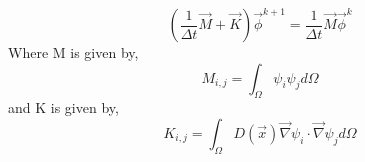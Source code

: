 \documentclass{article}
\begin{document}
\begin{equation}
\left(\frac{1}{\Delta t}\vec{M}+\vec{K}\right)\vec{\phi}^{k+1}=\frac{1}{\Delta t}\vec{M}\vec{\phi}^{k}
\end{equation}
Where M is given by,
\begin{equation}
M_{i,j}=\int_{\Omega}\psi_{i}\psi_{j}d\Omega
\end{equation}
and K is given by,
\begin{equation}
K_{i,j}=\int_{\Omega}D(\vec{x})\vec{\nabla}\psi_{i}\cdot \vec{\nabla}\psi_{j}d\Omega
\end{equation}
\end{document}
